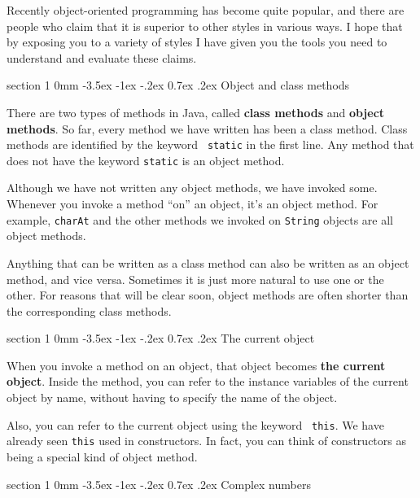 \documentclass{book}
\makeatletter
\renewcommand{\section}{\@startsection 
    {section} {1} {0mm}%
    {-3.5ex \@plus -1ex \@minus -.2ex}%
    {0.7ex \@plus.2ex}%
    {\normalfont\Large\bfseries}}
\makeatother
\begin{document}
Recently object-oriented programming has become quite popular, and
there are people who claim that it is superior to other styles in
various ways.  I hope that by exposing you to a variety of styles I
have given you the tools you need to understand and evaluate these
claims.


\section{Object and class methods}

There are two types of methods in Java, called {\bf class methods} and
{\bf object methods}.  So far, every method we have written has been a
class method.  Class methods are identified by the keyword {\tt
static} in the first line.  Any method that does not have the keyword
{\tt static} is an object method.

Although we have not written any object methods, we have invoked some.
Whenever you invoke a method ``on'' an object, it's an object method.
For example, {\tt charAt} and the other methods we invoked on {\tt String}
objects are all object methods.

Anything that can be written as a class method can also be written as an
object method, and vice versa.  Sometimes it is just more natural to
use one or the other.  For reasons that will be clear soon, object
methods are often shorter than the corresponding class methods.


\section{The current object}

When you invoke a method on an object, that object becomes {\bf the
current object}.  Inside the method, you can refer to the instance
variables of the current object by name, without having to specify the
name of the object.


Also, you can refer to the current object using the keyword {\tt
this}.  We have already seen {\tt this} used in constructors.  In
fact, you can think of constructors as being a special kind of object
method.


\section{Complex numbers}
\end{document}
